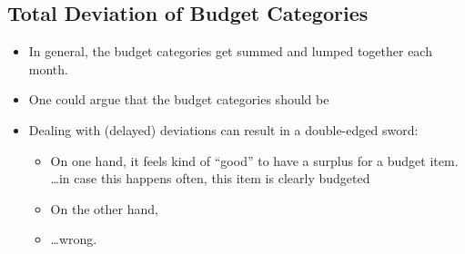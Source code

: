 \subsection{Total Deviation of Budget Categories}
\label{subsec:Total-Deviation}

\begin{itemize}
	\item In general, the budget categories get summed and lumped together each month.
	\item One could argue that the budget categories should be 
	\item Dealing with (delayed) deviations can result in a double-edged sword:
	\begin{itemize}
		\item On one hand, it feels kind of ``good'' to have a surplus for a budget item.\\
		\ldots in case this happens often, this item is clearly budgeted
		\item On the other hand, 
		\item \ldots  wrong.
	\end{itemize}
\end{itemize}


